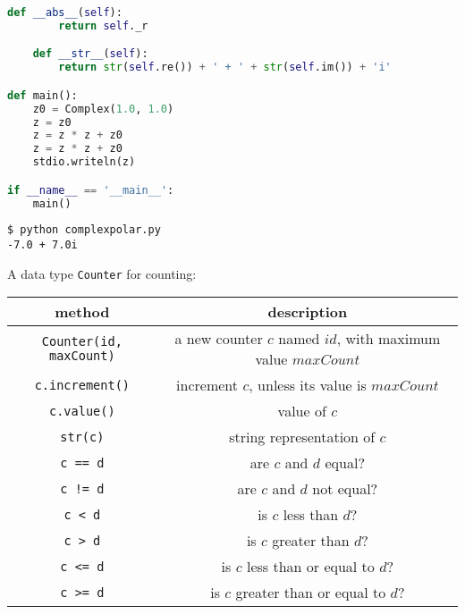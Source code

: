 \documentclass[8pt,a4paper,compress,handout]{beamer}
\begin{document}
\begin{frame}[fragile]
\begin{lstlisting}[language=Python]
    def __abs__(self):
        return self._r

    def __str__(self):
        return str(self.re()) + ' + ' + str(self.im()) + 'i'

def main():
    z0 = Complex(1.0, 1.0)
    z = z0
    z = z * z + z0
    z = z * z + z0
    stdio.writeln(z)

if __name__ == '__main__':
    main()
\end{lstlisting}

\begin{lstlisting}[language={}]
$ python complexpolar.py 
-7.0 + 7.0i
\end{lstlisting}
\end{frame}

\begin{frame}[fragile]
A data type \lstinline{Counter} for counting:
\begin{center}
\begin{tabular}{cc}
method & description \\ \hline
\lstinline$Counter(id, maxCount)$ & a new counter $c$ named $id$, with maximum value $maxCount$ \\
\lstinline$c.increment()$ & increment $c$, unless its value is $maxCount$ \\
\lstinline$c.value()$ & value of $c$ \\
\lstinline$str(c)$ & string representation of $c$ \\
\lstinline$c == d$ & are $c$ and $d$ equal? \\
\lstinline$c != d$ & are $c$ and $d$ not equal? \\
\lstinline$c < d$ & is $c$ less than $d$? \\
\lstinline$c > d$ & is $c$ greater than $d$? \\
\lstinline$c <= d$ & is $c$ less than or equal to $d$? \\
\lstinline$c >= d$ & is $c$ greater than or equal to $d$? \\
\end{tabular} 
\end{center}
\end{frame}
\end{document}
